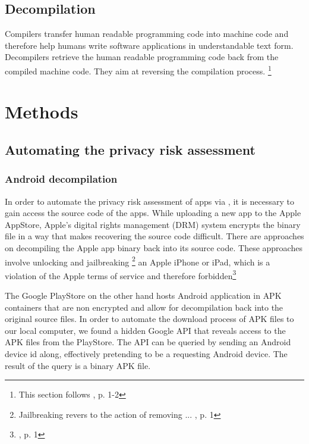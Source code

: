 \documentclass[
	a4paper,
	oneside,
	12pt,
	liststotocnumbered
]{article}
\let\cite\textcite
\begin{document}
\subsection{Decompilation}

Compilers transfer human readable programming code into machine code and therefore help humans write software applications in understandable text form. 
Decompilers retrieve the human readable programming code back from the compiled machine code. 
They aim at reversing the compilation process.
\footnote{This section follows \cite{nolan2012decompiling}, p. 1-2}

\section{Methods}

\subsection{Automating the privacy risk assessment}

\subsubsection{Android decompilation}

In order to automate the privacy risk assessment of \mH apps via \sca, it is necessary to gain access the source code of the apps. 
While uploading a new app to the Apple AppStore, Apple's digital rights management (\acs{DRM}) system encrypts the binary file in a way that makes recovering the source code difficult. 
There are approaches on decompiling the Apple app binary back into its source code.
These approaches involve unlocking and jailbreaking
\footnote{Jailbreaking revers to the action of removing ... \cite{Kweller2010}, p. 1}
an Apple iPhone or iPad, which is a violation of the Apple terms of service and therefore forbidden\footnote{\cite{Kweller2010}, p. 1}

The Google PlayStore on the other hand hosts Android application in \acs{APK} containers that are non encrypted and allow for decompilation back into the original source files. 
In order to automate the download process of \acs{APK} files to our local computer, we found a hidden Google \acs{API} that reveals access to the \acs{APK} files from the PlayStore. 
The \acs{API} can be queried by sending an Android device id along, effectively pretending to be a requesting Android device.
The result of the query is a binary \acs{APK} file.
\end{document}
